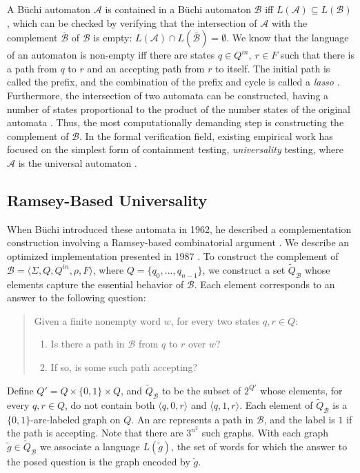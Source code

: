 \documentclass{LMCS}
\newcommand{\zug}[1]{\langle #1  \rangle}
\newcommand\buchi{B\"uchi }
\newcommand{\A}{{\mathcal A}}
\newcommand{\B}{{\mathcal B}}
\renewcommand{\graph}{\widetilde}
\begin{document}
A \buchi automaton $\A$ is contained in a \buchi automaton $\B$ iff $L(\A)
\subseteq L(\B)$, which can be checked by verifying that the intersection of
$\A$ with the complement $\overline{\B}$ of $\B$ is empty: $L(\A) \cap
L(\overline{\B})=\emptyset$.  We know that the language of an automaton is
non-empty iff there are states $q \in Q^{in},~ r \in F$ such that there is a
path from $q$ to $r$ and an accepting path from $r$ to itself.  The initial path
is called the prefix, and the combination of the prefix and cycle is called a
\emph{lasso} \cite{Var07a}.  Furthermore, the intersection of two automata can be
constructed, having a number of states proportional to the product of the number
states of the original automata \cite{Cho74}.
Thus, the most computationally demanding step is constructing the complement of
$\B$.  In the formal verification field, existing empirical work has focused on
the simplest form of containment testing, \emph{universality} testing, where
$\A$ is the universal automaton \cite{DR07,TV05}.

\subsection{Ramsey-Based Universality}\label{Sect:Ramsey-Based_Universality}

When \buchi introduced these automata in 1962, he described a complementation
construction involving a Ramsey-based combinatorial argument \cite{Buc62}. We describe an
optimized implementation presented in 1987 \cite{SVW85}.  To construct the complement of
$\B=\zug{\Sigma, Q, Q^{in}, \rho, F}$, where  $Q=\{q_0,...,q_{n-1}\}$, we
construct a set $\graph{Q}_\B$ whose elements capture the essential behavior of
$\B$.  Each element corresponds to an answer to the following question:

\begin{verse}
Given a finite nonempty word $w$, for every two states $q,r \in Q$:
\begin{enumerate}
\item Is there a path in $\B$ from $q$ to $r$ over $w$?
\item If so, is some such path accepting?
\end{enumerate}
\end{verse}

Define $Q'=Q\times\{0,1\}\times Q$, and $\graph{Q}_\B$ to be the subset of $2^{Q'}$
whose elements, for every $q, r \in Q$, do not contain both $\zug{q,0,r}$ and $\zug{q,1,r}$.  Each
element of $\graph{Q}_\B$ is a $\{0,1\}$-arc-labeled graph on $Q$. An arc represents a path in $\B$,
and the label is $1$ if the path is accepting. Note that there are $3^{n^2}$ such graphs.  With each
graph $\graph{g} \in \graph{Q}_\B$ we associate a language $L(\graph{g})$, the set of words for
which the answer to the posed question is the graph encoded by $\graph{g}$. 
\end{document}
